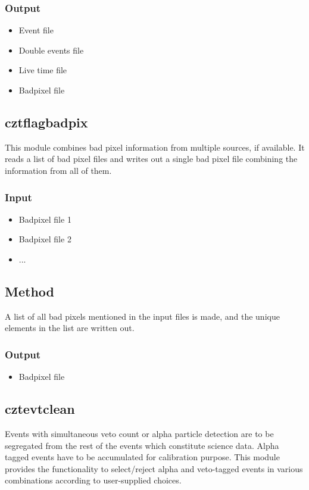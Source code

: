 \documentclass[11pt,oneside,a4paper]{article}
\begin{document}
\subsubsection*{Output}
\begin{itemize}
\item{Event file }
\item{Double events file}
\item{Live time file}
\item{Badpixel file}
\end{itemize}


\subsection{cztflagbadpix}
This module combines bad pixel information from multiple sources, if available.  It reads
a list of bad pixel files and writes out a single bad pixel file combining the information from
all of them.
\subsubsection*{Input}
\renewcommand\labelitemi{{\boldmath$\cdot$}}
\begin{itemize}
\item{Badpixel file 1}
\item{Badpixel file 2}
\item{...}
\end{itemize}
\subsection*{Method}
A list of all bad pixels mentioned in the input files is made, and the unique elements in the
list are written out.
\subsubsection*{Output}
\begin{itemize}
\item{Badpixel file}
\end{itemize}


\subsection{cztevtclean}
Events with simultaneous veto count or alpha particle detection are to be segregated 
from the rest of the events which constitute science data. 
Alpha tagged events have to be accumulated for calibration purpose.  
This module provides the functionality to select/reject alpha and veto-tagged events in 
various combinations according to user-supplied choices.
\end{document}
